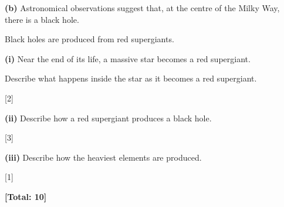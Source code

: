 \documentclass[12pt,a4paper]{article}
\newcommand{\totalmarks}[1]{\par\nopagebreak\hfill\textbf{[Total: #1]}\par}
\newcommand{\wline}{\par\vspace{1.5pt}\noindent\dotfill\par\vspace{1.5pt}}
\begin{document}
\newpage


\textbf{(b)} Astronomical observations suggest that, at the centre of the Milky Way, there is a black hole.

Black holes are produced from red supergiants.

\hspace*{1.5em}\textbf{(i)} Near the end of its life, a massive star becomes a red supergiant.

Describe what happens inside the star as it becomes a red supergiant.

\wline \wline \wline
\hfill[2]

\hspace*{1.5em}\textbf{(ii)} Describe how a red supergiant produces a black hole.

\wline \wline \wline \wline
\hfill[3]

\hspace*{1.5em}\textbf{(iii)} Describe how the heaviest elements are produced.

\wline \wline
\hfill[1]

\totalmarks{10}
\end{document}
